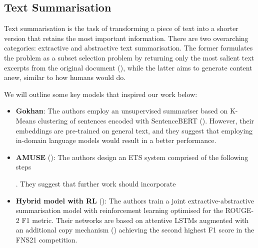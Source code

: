 \subsection{Text Summarisation}\label{subsec:text-summarisation}
Text summarisation is the task of transforming a piece of text into a shorter  version that retains the most important information.
There are two overarching categories: extractive and abstractive text summarisation.
The former formulates the problem as a subset selection problem by returning only the most salient text excerpts from the original document (\cite{zhong-etal-2020-extractive}), while the latter aims to generate content anew, similar to how humans would do.

We will outline some key models that inspired our work below:
\begin{itemize}
    \item \textbf{Gokhan}: The authors employ an unsupervised summariser based on K-Means clustering of sentences encoded with SentenceBERT (\cite{reimers2019sentence}).
    However, their embeddings are pre-trained on general text, and they suggest that employing in-domain language models would result in a better performance.

    \item \textbf{AMUSE} (\cite{litvak-vanetik-2021-summarization}): The authors design an ETS system comprised of the following steps .
    They suggest that further work should incorporate 

    \item \textbf{Hybrid model with RL} (\cite{zmandar-etal-2021-joint}): The authors train a joint extractive-abstractive summarisation model with reinforcement learning optimised for the ROUGE-2 F1 metric.
    Their networks are based on attentive LSTMs augmented with an additional copy mechanism (\cite{vinyals2015pointer}) achieving the second highest F1 score in the FNS21 competition.


\end{itemize}
